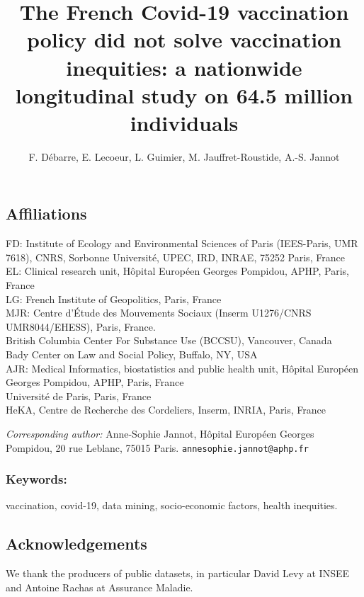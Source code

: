 \documentclass[
]{article}
\title{The French Covid-19 vaccination policy did not solve vaccination inequities: a nationwide longitudinal study on 64.5 million individuals}
\author{F. Débarre, E. Lecoeur, L. Guimier, M. Jauffret-Roustide, A.-S. Jannot}
\date{}
\begin{document}
\maketitle

\hypertarget{affiliations}{%
\subsection{Affiliations}\label{affiliations}}

FD: Institute of Ecology and Environmental Sciences of Paris (IEES-Paris, UMR 7618), CNRS, Sorbonne Université, UPEC, IRD, INRAE, 75252 Paris, France\\
EL: Clinical research unit, Hôpital Européen Georges Pompidou, APHP, Paris, France\\
LG: French Institute of Geopolitics, Paris, France\\
MJR: Centre d'Étude des Mouvements Sociaux (Inserm U1276/CNRS UMR8044/EHESS), Paris, France.\\
British Columbia Center For Substance Use (BCCSU), Vancouver, Canada\\
Bady Center on Law and Social Policy, Buffalo, NY, USA\\
AJR: Medical Informatics, biostatistics and public health unit, Hôpital Européen Georges Pompidou, APHP, Paris, France\\
Université de Paris, Paris, France\\
HeKA, Centre de Recherche des Cordeliers, Inserm, INRIA, Paris, France

\emph{Corresponding author:} Anne-Sophie Jannot, Hôpital Européen Georges Pompidou, 20 rue Leblanc, 75015 Paris. \texttt{annesophie.jannot@aphp.fr}

\hypertarget{keywords}{%
\subsubsection{Keywords:}\label{keywords}}

vaccination, covid-19, data mining, socio-economic factors, health inequities.

\hypertarget{acknowledgements}{%
\subsection{Acknowledgements}\label{acknowledgements}}

We thank the producers of public datasets, in particular David Levy at INSEE and Antoine Rachas at Assurance Maladie.
\end{document}
